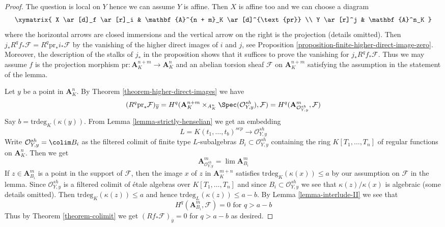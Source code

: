 \begin{proof}
The question is local on $Y$ hence we can assume $Y$ is affine.
Then $X$ is affine too and we can choose a diagram
$$
\xymatrix{
X \ar[d]_f \ar[r]_i & \mathbf{A}^{n + m}_K \ar[d]^{\text{pr}} \\
Y \ar[r]^j & \mathbf{A}^n_K
}
$$
where the horizontal arrows are closed immersions and the vertical
arrow on the right is the projection (details omitted).
Then $j_*R^qf_*\mathcal{F} = R^q\text{pr}_*i_*\mathcal{F}$
by the vanishing of the higher direct images of $i$ and $j$, see
Proposition \ref{proposition-finite-higher-direct-image-zero}.
Moreover, the description of the stalks of $j_*$ in the proposition
shows that it suffices to prove the vanishing for $j_*R^qf_*\mathcal{F}$.
Thus we may assume $f$ is the projection
morphism $\text{pr} : \mathbf{A}^{n + m}_K \to \mathbf{A}^n_K$
and an abelian torsion sheaf $\mathcal{F}$ on $\mathbf{A}^{n + m}_K$
satisfying the assumption in the statement of the lemma.

\medskip\noindent
Let $y$ be a point in $\mathbf{A}^n_K$.
By Theorem \ref{theorem-higher-direct-images} we have
$$
(R^q\text{pr}_*\mathcal{F})_{\overline{y}} =
H^q(\mathbf{A}^{n + m}_K \times_{A^n_K} \Spec(\mathcal{O}_{Y, y}^{sh}),
\mathcal{F}) =
H^q(\mathbf{A}^m_{\mathcal{O}_{Y, y}^{sh}}, \mathcal{F})
$$
Say $b = \text{trdeg}_K(\kappa(y))$. From Lemma \ref{lemma-strictly-henselian}
we get an embedding
$$
L = K(t_1, \ldots, t_b)^{sep} \longrightarrow \mathcal{O}_{Y, y}^{sh}
$$
Write $\mathcal{O}_{Y, y}^{sh} = \colim B_i$ as the filtered
colimit of finite type $L$-subalgebras $B_i \subset \mathcal{O}_{Y, y}^{sh}$
containing the ring $K[T_1, \ldots, T_n]$ of regular functions
on $\mathbf{A}^n_K$. Then we get
$$
\mathbf{A}^m_{\mathcal{O}_{Y, y}^{sh}} =
\lim \mathbf{A}^m_{B_i}
$$
If $z \in \mathbf{A}^m_{B_i}$ is a point in the support of
$\mathcal{F}$, then the image $x$ of $z$ in $\mathbf{A}^{m + n}_K$
satisfies $\text{trdeg}_K(\kappa(x)) \leq a$ by our assumption on
$\mathcal{F}$ in the lemma.
Since $\mathcal{O}_{Y, y}^{sh}$ is a filtered colimit of
\'etale algebras over $K[T_1, \ldots, T_n]$ and since
$B_i \subset \mathcal{O}_{Y, y}^{sh}$
we see that $\kappa(z)/\kappa(x)$ is algebraic
(some details omitted). Then $\text{trdeg}_K(\kappa(z)) \leq a$
and hence $\text{trdeg}_L(\kappa(z)) \leq a - b$.
By Lemma \ref{lemma-interlude-II} we see that
$$
H^q(\mathbf{A}^m_{B_i}, \mathcal{F}) = 0\text{ for }q > a - b
$$
Thus by Theorem \ref{theorem-colimit} we get
$(Rf_*\mathcal{F})_{\overline{y}} = 0$ for $q > a - b$
as desired.
\end{proof}








